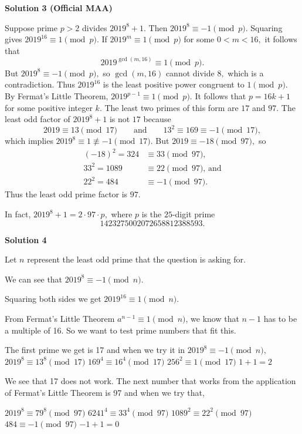 \begin{enumerate}
 



\textbf{Solution 3 (Official MAA)}

Suppose prime $p>2$ divides $2019^8+1.$ Then $2019^8\equiv -1\pmod p.$ Squaring gives $2019^{16}\equiv 1\pmod p.$ If $2019^m\equiv 1 \pmod p$ for some $0<m<16,$ it follows that 
 \[2019^{\gcd(m,16)}\equiv 1\pmod p.\] But $2019^8\equiv -1\pmod p,$ so $\gcd(m,16)$ cannot divide $8,$ which is a contradiction. Thus $2019^{16}$ is the least positive power congruent to $1\pmod p.$ By Fermat's Little Theorem, $2019^{p-1}\equiv 1\pmod p.$ It follows that $p=16k+1$ for some positive integer $k.$ The least two primes of this form are $17$ and $97.$ The least odd factor of $2019^8+1$ is not $17$ because 
 \[2019\equiv 13\pmod{17}\qquad \text{and}\qquad 13^2\equiv 169\equiv -1\pmod{17},\] which implies $2019^8\equiv 1\not\equiv -1\pmod {17}.$ But $2019\equiv -18\pmod{97},$ so 
 \begin{align*} (-18)^2=324&\equiv 33\pmod{97}, \\ 33^2=1089&\equiv 22\pmod{97},\,\text{and} \\ 22^2=484&\equiv -1\pmod{97}.\end{align*}
 Thus the least odd prime factor is $97.$

 In fact, $2019^8+1=2\cdot97\cdot p,$ where $p$ is the $25$-digit prime 
 \[1423275002072658812388593.\]




\textbf{Solution 4}

Let $n$ represent the least odd prime that the question is asking for. 

 We can see that $2019^8\equiv -1\pmod n.$

 Squaring both sides we get $2019^{16}\equiv 1\pmod n.$

 From Fermat's Little Theorem $a^{n-1}\equiv 1\pmod n$, we know that $n-1$ has to be a multiple of 16. So we want to test prime numbers that fit this. 

 The first prime we get is 17 and when we try it in $2019^8\equiv -1\pmod n,$
$2019^{8}\equiv 13^8\pmod {17}$
$169^{4}\equiv 16^4\pmod {17}$
$256^2\equiv 1\pmod {17}$
$1+1=2$ 

 We see that 17 does not work. The next number that works from the application of Fermat's Little Theorem is 97 and when we try that,

 $2019^{8}\equiv 79^8\pmod {97}$
$6241^{4}\equiv 33^4\pmod {97}$
$1089^2\equiv 22^2\pmod {97}$
$484\equiv -1\pmod {97}$
$-1+1=0$


\end{enumerate}
